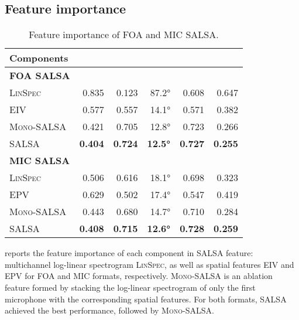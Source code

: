 \documentclass[journal]{IEEEtran}
\begin{document}
\subsection{Feature importance}

\begin{table}[t]
    \centering
    \setlength\tabcolsep{3pt}
    \caption{Feature importance of FOA and MIC SALSA.}
    \noindent\begin{tabularx}{\columnwidth}{Xrrrrr}
    \toprule 
        Components
        &  
        & 
        & 
        &  
        &  \\
    \midrule
    \bfseries FOA SALSA\\
    
        \textsc{LinSpec}            & 0.835 & 0.123 & 87.2\si{\degree} & 0.608 & 0.647 \\
        EIV           & 0.577 & 0.557 & 14.1\si{\degree} & 0.571 & 0.382 \\
        \textsc{Mono-SALSA}             & 0.421 & 0.705 & 12.8\si{\degree} & 0.723 & 0.266 \\
        SALSA              & \bf{0.404} & \bf{0.724} & \bf{12.5\si{\degree}} & \bf{0.727} & \bf{0.255} \\
    \midrule
    \bfseries MIC SALSA\\
    
        \textsc{LinSpec}            & 0.506 & 0.616 & 18.1\si{\degree} & 0.698 & 0.323 \\
        EPV           & 0.629 & 0.502 & 17.4\si{\degree} & 0.547 & 0.419 \\
        \textsc{Mono-SALSA}             & 0.443 & 0.680 & 14.7\si{\degree} & 0.710 & 0.284 \\
        SALSA              & \bf{0.408} & \bf{0.715} & \bf{12.6\si{\degree}} & \bf{0.728} & \bf{0.259} \\
    \bottomrule
    \end{tabularx}
    \label{tab:salsa_foa_feature_imp}
    \label{tab:salsa_mic_feature_imp}
\end{table}


 reports the feature importance of each component in SALSA feature: multichannel log-linear spectrogram \textsc{LinSpec}, as well as spatial features EIV and EPV for FOA and MIC formats, respectively. \textsc{Mono-SALSA} is an ablation feature formed by stacking the log-linear spectrogram of only the first microphone with the corresponding spatial features.
For both formats, SALSA achieved the best performance, followed by \textsc{Mono-SALSA}. 
\end{document}

